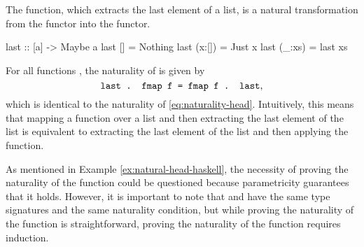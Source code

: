 \begin{example}

  \label{ex:natural-last-haskell}


  The  function, which extracts the last element of
  a list, is a natural transformation from the \texthaskell{[]}
  functor into the  functor.
  \begin{codehaskell}
    last :: [a] -> Maybe a
    last []     = Nothing
    last (x:[]) = Just x
    last (_:xs) = last xs
  \end{codehaskell}

  For all functions , the naturality of
   is given by
  \begin{equation}
    \label{eq:naturality-last}
    \text{\texttt{last . fmap f = fmap f . last}}
    \text{,}
  \end{equation}
  which is identical to the naturality of 
  \eqref{eq:naturality-head}. Intuitively, this means that mapping a
  function over a list and then extracting the last element of the
  list is equivalent to extracting the last element of the list and
  then applying the function.

  As mentioned in Example \ref{ex:natural-head-haskell}, the necessity
  of proving the naturality of the  function could
  be questioned because parametricity guarantees that it holds.
  However, it is important to note that  and
   have the same type signatures and the same
  naturality condition, but while proving the naturality of the
   function is straightforward, proving the
  naturality of the  function requires induction.


\end{example}
